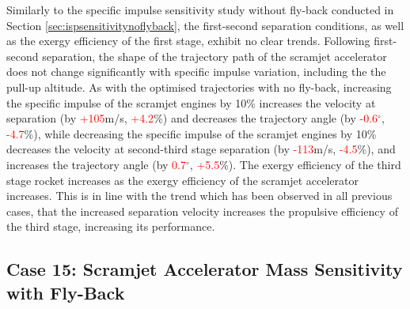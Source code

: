 Similarly to the specific impulse sensitivity study without fly-back conducted in Section \ref{sec:ispsensitivitynoflyback}, the first-second separation conditions, as well as the exergy efficiency of the first stage, exhibit no clear trends. Following first-second separation, the shape of the trajectory path of the scramjet accelerator does not change significantly with specific impulse variation, including the the pull-up altitude. As with the optimised trajectories with no fly-back, increasing the specific impulse of the scramjet engines by 10\% increases the velocity at separation (by \textcolor{red}{+105}m/s, \textcolor{red}{+4.2}\%) and decreases the trajectory angle (by \textcolor{red}{-0.6}$^\circ$, \textcolor{red}{-4.7}\%), while decreasing the specific impulse of the scramjet engines by 10\% decreases the velocity at second-third stage separation (by \textcolor{red}{-113}m/s, \textcolor{red}{-4.5}\%), and increases the trajectory angle (by \textcolor{red}{0.7}$^\circ$, \textcolor{red}{+5.5}\%).
The exergy efficiency of the third stage rocket increases as the exergy efficiency of the scramjet accelerator increases. This is in line with the trend which has been observed in all previous cases, that the increased separation velocity increases the propulsive efficiency of the third stage, increasing its performance. 






\subsection{Case 15: Scramjet Accelerator Mass Sensitivity with Fly-Back}\label{sec:m2var}


